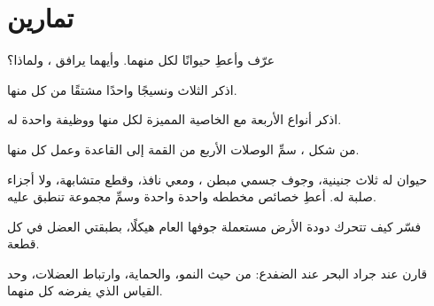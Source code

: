 \section{تمارين}

\begin{exercise}[$\star$]\label{exo:b1:body-plans-tissues:1}
عرّف   وأعطِ حيوانًا لكل منهما.
وأيهما يرافق ، ولماذا؟
\end{exercise}

\begin{exercise}[$\star$]\label{exo:b1:body-plans-tissues:2}
اذكر  الثلاث ونسيجًا واحدًا مشتقًا من كل منها.
\end{exercise}

\begin{exercise}[$\star$]\label{exo:b1:body-plans-tissues:3}
اذكر أنواع  الأربعة مع الخاصية المميزة لكل منها ووظيفة واحدة
له.
\end{exercise}

\begin{exercise}[$\star$]\label{exo:b1:body-plans-tissues:4}
من شكل ، سمِّ الوصلات الأربع من القمة إلى القاعدة وعمل كل
منها.
\end{exercise}

\begin{exercise}[$\star\star$]\label{exo:b1:body-plans-tissues:5}
حيوان له ثلاث  جنينية، وجوف جسمي مبطن ، ومعي
نافذ، وقطع متشابهة، ولا أجزاء صلبة له. أعطِ خصائص مخططه واحدة واحدة
وسمِّ مجموعة تنطبق عليه.
\end{exercise}

\begin{exercise}[$\star\star$]\label{exo:b1:body-plans-tissues:6}
فسّر كيف تتحرك دودة الأرض مستعملة جوفها العام هيكلًا، بطبقتي العضل
في كل قطعة.
\end{exercise}

\begin{exercise}[$\star\star$]\label{exo:b1:body-plans-tissues:7}
قارن  عند جراد البحر  عند الضفدع: من
حيث النمو، والحماية، وارتباط العضلات، وحد القياس الذي يفرضه كل
منهما.
\end{exercise}

